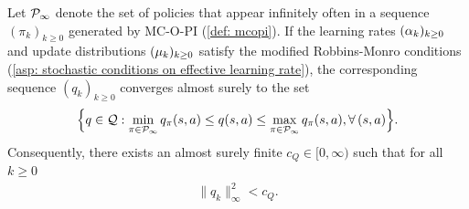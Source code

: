 \begin{lemma}
    \label{thm: bounded limit sets}
    Let $\mathcal{P}_\infty$ denote the set of policies that appear infinitely often in a sequence $(\pi_k)_{k \ge 0}$ generated by MC-O-PI (\autoref{def: mcopi}).
    If the learning rates $(\alpha_k)_{k \geq 0}$ and update distributions $(\mu_k)_{k \geq 0}$ satisfy the modified Robbins-Monro conditions (\autoref{asp: stochastic conditions on effective learning rate}),
    the corresponding sequence $(q_k)_{k \ge 0}$ converges almost surely to the set
    \begin{align*}
        \Big\{
        q \in \mathcal{Q} : 
        \min_{\pi \in \mathcal{P}_\infty} q_\pi(s,a) \leq q(s,a) \leq \max_{\pi \in \mathcal{P}_\infty} q_\pi(s,a),
        \forall \, (s,a)
        \Big\} .
    \end{align*}
    Consequently,
    there exists an almost surely finite $c_Q \in [0, \infty)$ such that for all $k \geq 0$
        \begin{align*}
            \| q_k \|_\infty^2 < c_Q .
        \end{align*}
\end{lemma}
\vspace{-0.6cm}
